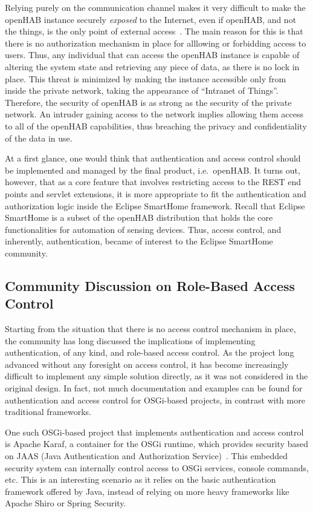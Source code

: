 \documentclass[12pt]{article}
\begin{document}
Relying purely on the communication channel makes it very difficult to make the openHAB instance securely \emph{exposed} to the Internet, even if openHAB, and not the things, is the only point of external access~\cite{openhab_03}. The main reason for this is that there is no authorization mechanism in place for alllowing or forbidding access to users. Thus, any individual that can access the openHAB instance is capable of altering the system state and retrieving any piece of data, as there is no lock in place. This threat is minimized by making the instance accessible only from inside the private network, taking the appearance of ``Intranet of Things''.  Therefore, the security of openHAB is as strong as the security of the private network. An intruder gaining access to the network implies allowing them access to all of the openHAB capabilities, thus breaching the privacy and confidentiality of the data in use.

At a first glance, one would think that authentication and access control should be implemented and managed by the final product, i.e.\ openHAB. It turns out, however, that as a core feature that involves restricting access to the REST end points and servlet extensions, it is more appropriate to fit the authentication and authorization logic inside the Eclipse SmartHome framework. Recall that Eclipse SmartHome is a subset of the openHAB distribution that holds the core functionalities for automation of sensing devices. Thus, access control, and inherently, authentication, became of interest to the Eclipse SmartHome community. 

\subsection{Community Discussion on Role-Based Access Control}
\label{ssec:discussion}

Starting from the situation that there is no access control mechanism in place, the community has long discussed the implications of implementing authentication, of any kind, and role-based access control. As the project long advanced without any foresight on access control, it has become increasingly difficult to implement any simple solution directly, as it was not considered in the original design. In fact, not much documentation and examples can be found for authentication and access control for OSGi-based projects, in contrast with more traditional frameworks.

One such OSGi-based project that implements authentication and access control is Apache Karaf, a container for the OSGi runtime, which provides security based on JAAS (Java Authentication and Authorization Service)~\cite{karaf}. This embedded security system can internally control access to OSGi services, console commands, etc. This is an interesting scenario as it relies on the basic authentication framework offered by Java, instead of relying on more heavy frameworks like Apache Shiro or Spring Security.
\end{document}
